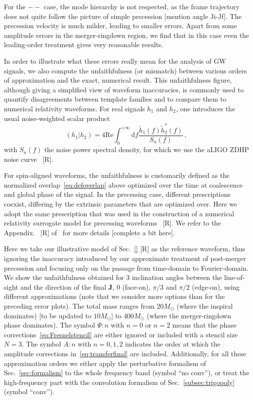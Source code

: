 \documentclass[aps,showpacs,twocolumn,
prd,superscriptaddress,nofootinbib]{revtex4-1}
\newcommand{\be}{\begin{equation}}
\newcommand{\ee}{\end{equation}}
\newcommand\ud{{\mathrm{d}}}
\newcommand{\Msol}{M_{\odot}}
\newcommand{\SM}[1]{{\color{Red} #1}}
\begin{document}
For the $--$ case, the mode hierarchy is not respected, as the frame trajectory does not quite follow the picture of simple precession \SM{[mention angle Ji-Jf]}. The precession velocity is much milder, leading to smaller errors. Apart from some amplitude errors in the merger-ringdown region, we find that in this case even the leading-order treatment gives very reasonable results.

In order to illustrate what these errors really mean for the analysis of GW signals, we also compute the unfaithfulness (or mismatch) between various orders of approximation and the exact, numerical result. This unfaithfulness figure, although giving a simplified view of waveform inaccuracies, is commonly used to quantify disagreements between template families and to compare them to numerical relativity waveforms. For real signals $h_{1}$ and $h_{2}$, one introduces the usual noise-weighted scalar product
\be\label{eq:defoverlap}
	\left( h_{1} | h_{2} \right) = 4\text{Re} \int_{0}^{+\infty} \ud f \frac{\tilde{h}_{1}(f) \tilde{h}_{2}^{*}(f)}{S_{n}(f)} \,,
\ee
with $S_{n}(f)$ the noise power spectral density, for which we use the aLIGO ZDHP noise curve~\cite{} \SM{[R]}.

For spin-aligned waveforms, the unfaithfulness is customarily defined as the normalized overlap~\eqref{eq:defoverlap} above optimized over the time at coalescence and global phase of the signal. In the precessing case, different prescriptions coexist, differing by the extrinsic parameters that are optimized over. Here we adopt the same prescription that was used in the construction of a numerical relativity surrogate model for precessing waveforms~\cite{} \SM{[R]}. We refer to the Appendix.~\SM{[R]} of~\cite{} for more details \SM{[complete a bit here]}.

Here we take our illustrative model of Sec.~\ref{} \SM{[R]} as the reference waveform, thus ignoring the inaccuracy introduced by our approximate treatment of post-merger precession and focusing only on the passage from time-domain to Fourier-domain. We show the unfaithfulness obtained for 3 inclination angles between the line-of-sight and the direction of the final $\bm{J}$, $0$ (face-on), $\pi/3$ and $\pi/2$ (edge-on), using different approximations (note that we consider more options than for the preceding error plots). The total mass ranges from $20\Msol$ (where the inspiral dominates) \SM{[to be updated to $10 \Msol$]} to $400\Msol$ (where the merger-ringdown phase dominates). The symbol $\Psi:n$ with $n=0$ or $n=2$ means that the phase corrections~\eqref{eq:Fresnelstencil} are either ignored or included with a stencil size $N=3$. The symbol $A:n$ with $n=0,1,2$ indicates the order at which the amplitude corrections in~\eqref{eq:transferfinal} are included. Additionally, for all these approximation orders we either apply the perturbative formalism of Sec.~\ref{sec:formalism} to the whole frequency band (symbol ``no conv''), or treat the high-frequency part with the convolution formalism of Sec.~\ref{subsec:trigopoly} (symbol ``conv''). 
\end{document}
